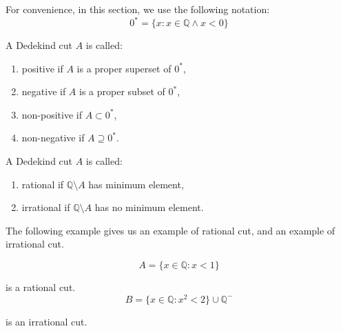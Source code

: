 \documentclass[class=mike-apostol-mathematical-analysis,crop=false]{standalone}
\begin{document}
\par For convenience, in this section, we use the following notation:
\[
    {0}^{*} = \{ x : x\in\mathbb{Q} \wedge x < 0 \}
\]

\begin{definition}
    A Dedekind cut $ A$ is called:
    \begin{enumerate}[label = (\roman*)]
        \item positive if $ A$ is a proper superset of ${0}^{*}$,
        \item negative if $ A$ is a proper subset of ${0}^{*}$,
        \item non-positive if $ A\subset {0}^{*}$,
        \item non-negative if $ A\supseteq {0}^{*}$.
    \end{enumerate}
\end{definition}

\begin{definition}
    A Dedekind cut $ A$ is called:
    \begin{enumerate}[label = (\roman*)]
        \item rational if $\mathbb{Q}\setminus A$ has minimum element,
        \item irrational if $\mathbb{Q}\setminus A$ has no minimum element.
    \end{enumerate}
\end{definition}

\par The following example gives us an example of rational cut, and an example of irrational cut.

\begin{example}
    \[
        A = \{ x\in\mathbb{Q}: x < 1 \}
    \]
    \par is a rational cut.
    \[
        B = \{ x\in\mathbb{Q}: {x}^{2} < 2 \} \cup \mathbb{Q}^{-}
    \]
    \par is an irrational cut.
\end{example}
\end{document}
